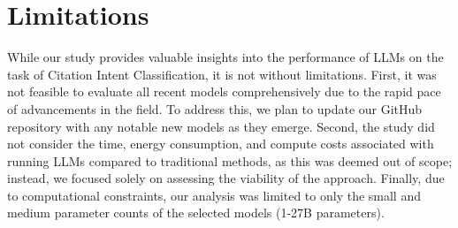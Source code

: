 \newpage
\section{Limitations}\label{sec:limitations}

While our study provides valuable insights into the performance of LLMs on the task of Citation Intent Classification, it is not without limitations. First, it was not feasible to evaluate all recent models comprehensively due to the rapid pace of advancements in the field. To address this, we plan to update our GitHub repository with any notable new models as they emerge. Second, the study did not consider the time, energy consumption, and compute costs associated with running LLMs compared to traditional methods, as this was deemed out of scope; instead, we focused solely on assessing the viability of the approach. Finally, due to computational constraints, our analysis was limited to only the small and medium parameter counts of the selected models (1-27B parameters).

